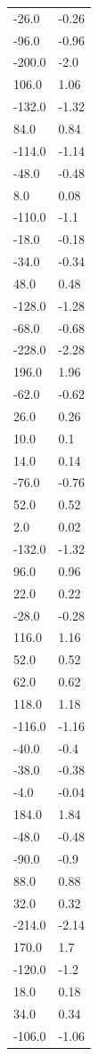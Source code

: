 \begin{longtable}{ll}
-26.0 & -0.26 \\
-96.0 & -0.96 \\
-200.0 & -2.0 \\
106.0 & 1.06 \\
-132.0 & -1.32 \\
84.0 & 0.84 \\
-114.0 & -1.14 \\
-48.0 & -0.48 \\
8.0 & 0.08 \\
-110.0 & -1.1 \\
-18.0 & -0.18 \\
-34.0 & -0.34 \\
48.0 & 0.48 \\
-128.0 & -1.28 \\
-68.0 & -0.68 \\
-228.0 & -2.28 \\
196.0 & 1.96 \\
-62.0 & -0.62 \\
26.0 & 0.26 \\
10.0 & 0.1 \\
14.0 & 0.14 \\
-76.0 & -0.76 \\
52.0 & 0.52 \\
2.0 & 0.02 \\
-132.0 & -1.32 \\
96.0 & 0.96 \\
22.0 & 0.22 \\
-28.0 & -0.28 \\
116.0 & 1.16 \\
52.0 & 0.52 \\
62.0 & 0.62 \\
118.0 & 1.18 \\
-116.0 & -1.16 \\
-40.0 & -0.4 \\
-38.0 & -0.38 \\
-4.0 & -0.04 \\
184.0 & 1.84 \\
-48.0 & -0.48 \\
-90.0 & -0.9 \\
88.0 & 0.88 \\
32.0 & 0.32 \\
-214.0 & -2.14 \\
170.0 & 1.7 \\
-120.0 & -1.2 \\
18.0 & 0.18 \\
34.0 & 0.34 \\
-106.0 & -1.06 \\

\end{longtable}
